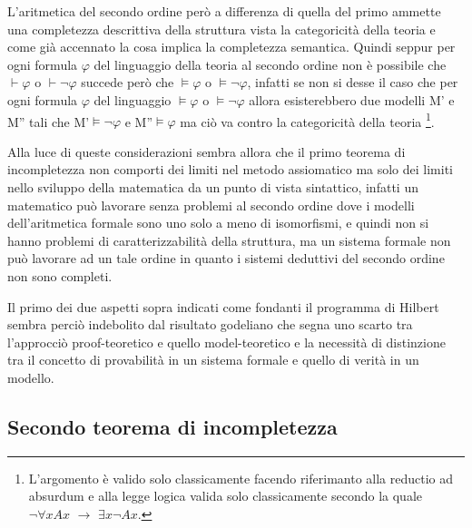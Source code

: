 L'aritmetica del secondo ordine però a differenza di quella del primo
ammette una completezza descrittiva della struttura vista la categoricità
della teoria e come già accennato la cosa implica la completezza semantica.
Quindi seppur per ogni formula $\varphi$ del linguaggio della teoria
al secondo ordine non è possibile che $\vdash\varphi$ o $\vdash\neg\varphi$
succede però che $\models\varphi$ o $\models\neg\varphi$, infatti
se non si desse il caso che per ogni formula $\varphi$ del linguaggio
$\models\varphi$ o $\models\neg\varphi$ allora esisterebbero due
modelli M' e M'' tali che M'$\models\neg\varphi$ e M''$\models\varphi$
ma ciò va contro la categoricità della teoria%
\footnote{L'argomento è valido solo classicamente facendo riferimanto alla reductio
ad absurdum e alla legge logica valida solo classicamente secondo
la quale $\neg\forall xAx$ $\rightarrow$ $\exists x\neg Ax$.%
}.

Alla luce di queste considerazioni sembra allora che il primo teorema
di incompletezza non comporti dei limiti nel metodo assiomatico ma
solo dei limiti nello sviluppo della matematica da un punto di vista
sintattico, infatti un matematico può lavorare senza problemi al secondo
ordine dove i modelli dell'aritmetica formale sono uno solo a meno
di isomorfismi, e quindi non si hanno problemi di caratterizzabilità
della struttura, ma un sistema formale non può lavorare ad un tale
ordine in quanto i sistemi deduttivi del secondo ordine non sono completi.

Il primo dei due aspetti sopra indicati come fondanti il programma
di Hilbert sembra perciò indebolito dal risultato godeliano che segna
uno scarto tra l'approcciò proof-teoretico e quello model-teoretico
e la necessità di distinzione tra il concetto di provabilità in un
sistema formale e quello di verità in un modello.


\subsection{Secondo teorema di incompletezza}

